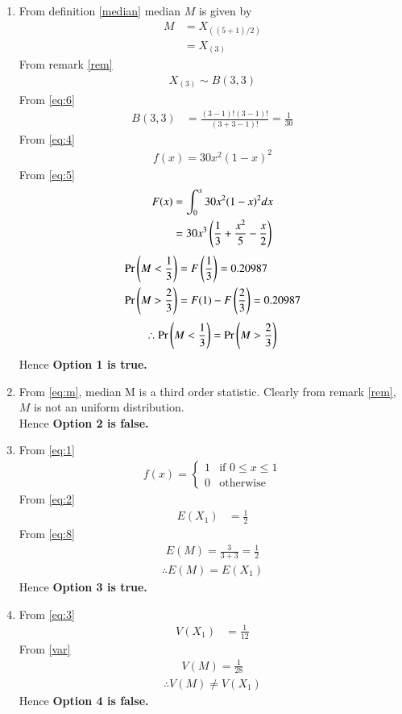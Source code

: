 \documentclass[journal,12pt,twocolumn]{IEEEtran}
\begin{document}
\begin{enumerate}
 \item 
From definition \eqref{median} median $M$ is given by
\begin{align}
  M &= X_{((5+1)/2)}\\
  &=X_{(3)}\label{eq:m}
\end{align}
From remark \eqref{rem} 
\begin{align}
X_{(3)} \sim B(3,3)
\end{align}
From \eqref{eq:6}
\begin{align}
    B(3,3)&=\frac{(3-1)!(3-1)!}{(3+3-1)!}=\frac{1}{30}
 \end{align}
 From \eqref{eq:4}
 \begin{align}
     f(x)=30x^{2}(1-x)^{2}
 \end{align}
 From \eqref{eq:5}
 \begin{align}
     F(x)&=\int_{0}^{x}30x^{2}(1-x)^{2}dx\\
     &=30x^{3}\left(\frac{1}{3}+\frac{x^2}{5}-\frac{x}{2}\right)
 \end{align}
 \begin{align}
     \Pr\left(M<\frac{1}{3}\right)&=F\left(\frac{1}{3}\right)=0.20987\\
     \Pr\left(M>\frac{2}{3}\right)&=F(1)-F\left(\frac{2}{3}\right)=0.20987
 \end{align}
 \begin{align}
      \therefore \Pr\left(M<\frac{1}{3}\right)=\Pr\left(M>\frac{2}{3}\right)
 \end{align}
  Hence \textbf{Option 1 is true.}
    
    
    
    
 \item From \eqref{eq:m}, median M is a third order statistic. Clearly from remark \eqref{rem}, $M$ is not an uniform distribution.
\\Hence \textbf{Option 2 is false.}

\item From \eqref{eq:1}
\begin{align}
    f(x)=
    \begin{cases}
    1 & \text{if } 0\leq x \leq 1\\
    0 & \text{otherwise}
    \end{cases}
\end{align}
From \eqref{eq:2} 
\begin{align}
    E(X_1)&=\frac{1}{2}
\end{align}
From \eqref{eq:8}
\begin{align}
    E(M)=\frac{3}{3+3}=\frac{1}{2}
\end{align}
 \begin{align}
      \therefore E(M)=E(X_1)
 \end{align}
   Hence \textbf{Option 3 is true.}

\item From \eqref{eq:3}
\begin{align}
      V(X_1)&=\frac{1}{12}
\end{align}
From \eqref{var}
\begin{align}
    V(M)=\frac{1}{28}
\end{align}
\begin{align}
      \therefore V(M)\neq V(X_1)
 \end{align}
   Hence \textbf{Option 4 is false.}
\end{enumerate}
\end{document}
